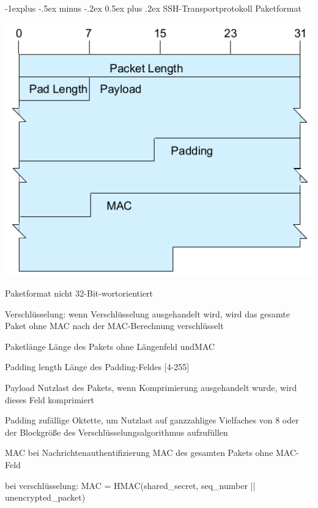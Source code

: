 \documentclass[a4paper]{article}
\makeatletter
\renewcommand{\subsection}{\@startsection{subsection}{2}{0mm}%
 {-1explus -.5ex minus -.2ex}%
 {0.5ex plus .2ex}%
 {\normalfont\normalsize\bfseries}}
\makeatother
\begin{document}
\begin{multicols}{3}
      \subsection{SSH-Transportprotokoll Paketformat}
      \begin{multicols}{2}
            \includegraphics[width=.6\linewidth]{Assets/NetworkSecurity-ssh-transport-protocol-packet.png}

            \begin{itemize*}
                  \item Paketformat nicht 32-Bit-wortorientiert
                  \item Verschlüsselung: wenn Verschlüsselung ausgehandelt wird, wird das gesamte Paket ohne MAC nach der MAC-Berechnung verschlüsselt
            \end{itemize*}
      \end{multicols}
      \begin{description*}
            \item[Paketlänge] Länge des Pakets ohne Längenfeld undMAC
            \item[Padding length] Länge des Padding-Feldes [4-255]
            \item[Payload] Nutzlast des Pakets, wenn Komprimierung ausgehandelt wurde, wird dieses Feld komprimiert
            \item[Padding] zufällige Oktette, um Nutzlast auf ganzzahliges Vielfaches von 8 oder der Blockgröße des Verschlüsselungsalgorithmus aufzufüllen
            \item[MAC] bei Nachrichtenauthentifizierung MAC des gesamten Pakets ohne MAC-Feld
            \item bei verschlüsselung: MAC = HMAC(shared\_secret, seq\_number || unencrypted\_packet) %
      \end{description*}


\end{multicols}
\end{document}
